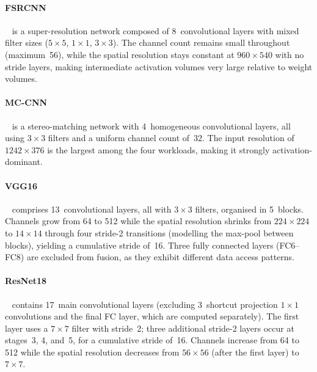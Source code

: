 \paragraph{FSRCNN}~\cite{fsrcnn_paper} is a super-resolution network
composed of 8~convolutional layers with mixed filter sizes
($5 \times 5$, $1 \times 1$, $3 \times 3$).
The channel count remains small throughout (maximum~56), while the
spatial resolution stays constant at $960 \times 540$ with no stride
layers, making intermediate activation volumes very large relative to
weight volumes.

\paragraph{MC-CNN}~\cite{mccnn_paper} is a stereo-matching network with
4~homogeneous convolutional layers, all using $3 \times 3$ filters and
a uniform channel count of~32.
The input resolution of $1242 \times 376$ is the largest among the four
workloads, making it strongly activation-dominant.

\paragraph{VGG16}~\cite{vgg_paper} comprises 13~convolutional layers,
all with $3 \times 3$ filters, organised in 5~blocks.
Channels grow from 64 to 512 while the spatial resolution shrinks from
$224 \times 224$ to $14 \times 14$ through four stride-2 transitions
(modelling the max-pool between blocks), yielding a cumulative stride
of~16.
Three fully connected layers (FC6--FC8) are excluded from fusion, as
they exhibit different data access patterns.

\paragraph{ResNet18}~\cite{resnet_paper} contains 17~main convolutional
layers (excluding 3~shortcut projection $1 \times 1$ convolutions and
the final FC layer, which are computed separately).
The first layer uses a $7 \times 7$ filter with stride~2; three
additional stride-2 layers occur at stages~3, 4, and~5, for a
cumulative stride of~16.
Channels increase from 64 to 512 while the spatial resolution
decreases from $56 \times 56$ (after the first layer) to $7 \times 7$.
